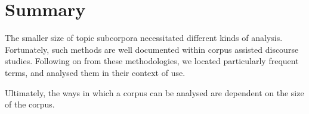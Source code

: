 \section{Summary}

    The smaller size of topic subcorpora necessitated different kinds of analysis. Fortunately, such methods are well documented within corpus assisted discourse studies. Following on from these methodologies, we located particularly frequent terms, and analysed them in their context of use.


    Ultimately, the ways in which a corpus can be analysed are dependent on the size of the corpus. 




